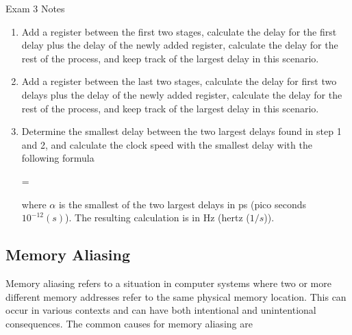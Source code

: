 \begin{examnotes}{Exam 3 Notes}
    \begin{enumerate}
        \item Add a register between the first two stages, calculate the delay for the first delay plus the delay of the newly added register, calculate the delay for the rest of the process, and keep
        track of the largest delay in this scenario.
        \item Add a register between the last two stages, calculate the delay for first two delays plus the delay of the newly added register, calculate the delay for the rest of the process, and keep
        track of the largest delay in this scenario.
        \item Determine the smallest delay between the two largest delays found in step 1 and 2, and calculate the clock speed with the smallest delay with the following formula
        \begin{center}
            \begin{highlightbox}
                 = 
            \end{highlightbox}
        \end{center}
        where $\alpha$ is the smallest of the two largest delays in ps (pico seconds $10^{-12} (s)$). The resulting calculation is in Hz (hertz ($1 / s$)).
    \end{enumerate}

    \subsection*{Memory Aliasing}

    Memory aliasing refers to a situation in computer systems where two or more different memory addresses refer to the same physical memory location. This can occur in various contexts and can have 
    both intentional and unintentional consequences. The common causes for memory aliasing are


\end{examnotes}
